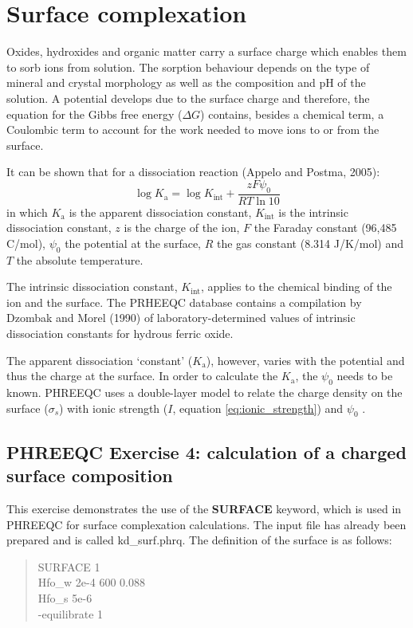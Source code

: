 \section{Surface complexation}
Oxides, hydroxides and organic matter carry a surface charge which enables them to sorb ions from solution. The sorption behaviour depends on the type of mineral and crystal morphology as well as the composition and pH of the solution. A potential develops due to the surface charge and therefore, the equation for the Gibbs free energy ($\Delta G$) contains, besides a chemical term, a Coulombic term to account for the work needed to move ions to or from the surface.

It can be shown that for a dissociation reaction (Appelo and Postma, 2005):
\begin{equation}
\log K_{\text{a}} = \log K_{\text{int}} + \frac{zF\psi_0}{RT \ln 10}
\end{equation}
in which $K_{\text{a}}$ is the apparent dissociation constant, $K_{\text{int}}$ is the intrinsic dissociation constant, $z$ is the charge of the ion, $F$ the Faraday constant (96,485 C/mol), $\psi_0$ the potential at the surface, $R$ the gas constant (8.314 J/K/mol) and $T$ the absolute temperature.

The intrinsic dissociation constant, $K_{\text{int}}$, applies to the chemical binding of the ion and the surface. The PRHEEQC database contains a compilation by Dzombak and Morel (1990) of laboratory-determined values of intrinsic dissociation constants for hydrous ferric oxide.

The apparent dissociation `constant' ($K_{\text{a}}$), however, varies with the potential and thus the charge at the surface. In order to calculate the $K_{\text{a}}$, the $\psi_0$ needs to be known. PHREEQC uses a double-layer model to relate the charge density on the surface ($\sigma_s$) with ionic strength ($I$, equation \ref{eq:ionic_strength}) and $\psi_0$ \citep{phreeqc2}.

\subsection{PHREEQC Exercise 4: calculation of a charged surface composition}
This exercise demonstrates the use of the \textbf{SURFACE} keyword, which is used in PHREEQC for surface complexation calculations. The input file has already been prepared and is called {\color{red}kd\_surf.phrq}. The definition of the surface is as follows:

\begin{quote}
	SURFACE 1 \\
	Hfo\_w	2e-4	600	0.088 \\
	Hfo\_s	5e-6 \\
	-equilibrate 1 
\end{quote}

